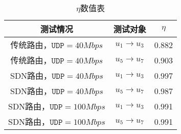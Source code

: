 \begin{table}[ht]
  \centering
  \begin{tabular}{ccc}
    \toprule
    测试情况 & 测试对象 & $\eta$ \\
    \midrule
    传统路由，$\texttt{UDP}=40Mbps$ & $u_1 \rightarrow u_3$ & 0.882 \\
    传统路由，$\texttt{UDP}=40Mbps$ & $u_5 \rightarrow u_7$ & 0.903 \\
    SDN路由，$\texttt{UDP}=40Mbps$ & $u_1 \rightarrow u_3$ & 0.997 \\
    SDN路由，$\texttt{UDP}=40Mbps$ & $u_5 \rightarrow u_7$ & 0.987 \\
    SDN路由，$\texttt{UDP}=100Mbps$ & $u_1 \rightarrow u_3$ & 0.991 \\
    SDN路由，$\texttt{UDP}=100Mbps$ & $u_5 \rightarrow u_7$ & 0.991 \\
    \bottomrule
  \end{tabular}
  \caption{$\eta$数值表}
  \end{table}